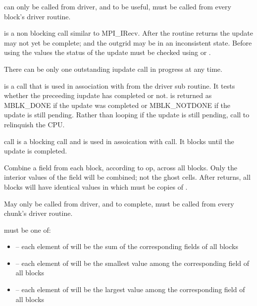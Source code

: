 \documentclass[10pt]{article}
\begin{document}
      can only be called from driver, and to be useful,
     must be called from every block's driver routine.

      is a non blocking call similar to MPI\_IRecv.
     After the routine returns the update may not yet be complete; and the
     outgrid may be in an inconsistent state.  Before using the values the 
     status of the
     update must be checked using  or 
     .

     There can be only one outstanding iupdate call in progress at any time.
     
\vspace{0.2in}
      is a call that is used in association with 
      from the driver sub routine.  It tests whether
      the preceeding iupdate has completed or not.
      is returned as MBLK\_DONE if the update was completed or 
      MBLK\_NOTDONE if the update is still pending.
     Rather than looping if the update is still pending, call 
     to relinquish the CPU.

\vspace{0.2in}
      call is a blocking call and is used in assoication 
     with  call. It blocks until the update is completed.

\vspace{0.2 in}
     Combine a field from each block, according to op, across all blocks.
     Only the interior values of the field will be combined; not the ghost cells.
     After  returns, all blocks will have identical
values in  which must be  copies of .


     May only be called from driver, and to complete, must be called
     from every chunk's driver routine.

      must be one of:

\begin{itemize}
        \item {}-- each element of  will be the sum 
of the corresponding fields of all blocks
        \item {}-- each element of  will be the 
smallest value among the corresponding field of all blocks
        \item {}-- each element of  will be the largest 
value among the corresponding field of all blocks
\end{itemize}
\end{document}
